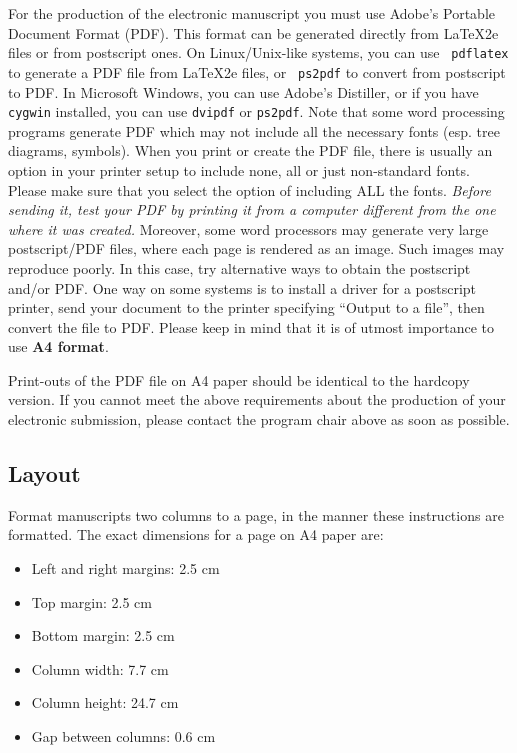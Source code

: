 \documentclass[11pt]{article}
\begin{document}
For the production of the electronic manuscript you must use Adobe's
Portable Document Format (PDF). 
This format can be generated directly from \LaTeX2e files or from
postscript ones. On Linux/Unix-like systems, you can use {\tt
  pdflatex} to generate a PDF file from \LaTeX2e files, or {\tt
  ps2pdf} to convert from postscript to PDF. 
In Microsoft Windows, you can use Adobe's Distiller, or if you have
\texttt{cygwin} installed, you can use \texttt{dvipdf} or
\texttt{ps2pdf}. Note that some word processing programs generate PDF
which may not include all the necessary fonts (esp. tree diagrams,
symbols). When you print or create the PDF file, there is usually an
option in your printer setup to include none, all or just non-standard
fonts.  Please make sure that you select the option of including ALL
the fonts. {\em Before sending it, test your PDF by printing it from a
  computer different from the one where it was created.} Moreover,
some word processors may generate very large postscript/PDF files,
where each page is rendered as an image. Such images may reproduce
poorly. In this case, try alternative ways to obtain the postscript
and/or PDF. One way on some systems is to install a driver for a
postscript printer, send your document to the printer specifying
``Output to a file'', then convert the file to PDF.
Please keep in mind that it is of utmost importance to use \textbf{A4 format}.


Print-outs of the PDF file on A4 paper should be identical to the
hardcopy version. If you cannot meet the above requirements about the
production of your electronic submission, please contact the
program chair above as soon as possible.


\subsection{Layout}
\label{ssec:layout}

Format manuscripts two columns to a page, in the manner these
instructions are formatted. The exact dimensions for a page on A4
paper are:

\begin{itemize}
\item Left and right margins: 2.5 cm
\item Top margin: 2.5 cm
\item Bottom margin: 2.5 cm
\item Column width: 7.7 cm
\item Column height: 24.7 cm
\item Gap between columns: 0.6 cm
\end{itemize}
\end{document}
